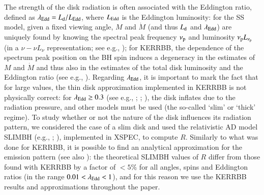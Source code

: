 \documentclass[]{aa}
\begin{document}
The strength of the disk radiation is often associated with the Eddington ratio, defined as $\lambda_{\rm Edd} = L_{\rm d} / L_{\rm Edd}$, where $L_{\rm Edd}$ is the Eddington luminosity: for the SS model, given a fixed viewing angle, $M$ and $\dot{M}$ (and thus $L_{\rm d}$ and $\lambda_{\rm Edd}$) are uniquely found by knowing the spectral peak frequency $\nu_{\rm p}$ and luminosity $\nu_{\rm p} L_{\nu_{\rm p}}$ (in a $\nu - \nu L_{\nu}$ representation; see e.g., \citealt{Caldero}); for KERRBB, the dependence of the spectrum peak position on the BH spin induces a degeneracy in the estimates of $M$ and $\dot{M}$ and thus also in the estimates of the total disk luminosity and the Eddington ratio (see e.g., \citealt{Campiti, Campitib}). Regarding $\lambda_{\rm Edd}$, it is important to mark the fact that for large values, the thin disk approximation implemented in KERRBB is not physically correct: for $\lambda_{\rm Edd} \geq 0.3$ (see e.g., \citealt{LaoNet}; \citealt{Kora}; \citealt{McClint}), the disk inflates due to the radiation pressure, and other models must be used (the so-called `slim' or `thick' regime). To study whether or not the nature of the disk influences its radiation pattern, we considered the case of a slim disk and used the relativistic AD model SLIMBH (e.g., \citealt{Sad09}; \citealt{SadwAbra09,SadwAbra}), implemented in XSPEC, to compute $R$. Similarly to what was done for KERRBB, it is possible to find an analytical approximation for the emission pattern (see also \citealt{Campitib}): the theoretical SLIMBH values of $R$ differ from those found with KERRBB by a factor of $< 5\%$ for all angles, spins and Eddington ratios (in the range $0.01 < \lambda_{\rm Edd} < 1$), and for this reason we use the KERRBB results and approximations throughout the paper.
\end{document}
